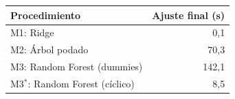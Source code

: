 \begin{tabular}{lr}
\toprule
Procedimiento & Ajuste final (s) \\
\midrule
M1: Ridge & 0{,}1 \\
M2: Árbol podado & 70{,}3 \\
M3: Random Forest (dummies) & 142{,}1 \\
M3$^\ast$: Random Forest (cíclico) & 8{,}5 \\
\bottomrule
\end{tabular}